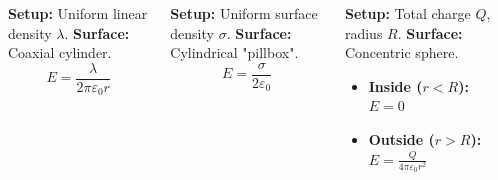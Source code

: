 \begin{frame}
\begin{frame}
\begin{columns}[T]
    \begin{examplebox}
    \vspace{0.1cm}
    \textbf{Setup:} Uniform linear density $\lambda$.
    \textbf{Surface:} Coaxial cylinder.
    \begin{equation*}
    E = \frac{\lambda}{2\pi\varepsilon_0 r}
    \end{equation*}
    \end{examplebox}
    
    \vspace{0.2cm}
    
    \begin{examplebox}
    \vspace{0.1cm}
    \textbf{Setup:} Uniform surface density $\sigma$.
    \textbf{Surface:} Cylindrical "pillbox".
    \begin{equation*}
    E = \frac{\sigma}{2\varepsilon_0}
    \end{equation*}
    \end{examplebox}
    
    \vspace{0.2cm}
    
    \begin{examplebox}
    \vspace{0.1cm}
    \textbf{Setup:} Total charge $Q$, radius $R$.
    \textbf{Surface:} Concentric sphere.
    \begin{itemize}
        \item \textbf{Inside ($r<R$):} $E = 0$
        \item \textbf{Outside ($r>R$):} $E = \frac{Q}{4\pi\varepsilon_0 r^2}$
    \end{itemize}
    \end{examplebox}

    \begin{center}
    \end{center}
    

\end{columns}
\end{frame}
\end{frame}
